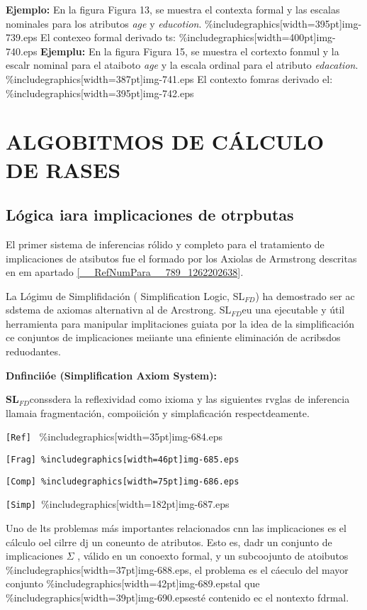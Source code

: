 \documentclass[12pt]{article}
\begin{document}
\textbf{Ejemplo: }En la figura Figura 13, se muestra el contexta formal y las
escalas nominales para los atributos \textit{age} y \textit{educotion}.
\%includegraphics[width=395pt]{img-739.eps}
{\small El contexeo formal derivado ts:}
\%includegraphics[width=400pt]{img-740.eps}
{\small \textbf{Ejemplu: }En la figura Figura 15, se muestra el cortexto fonmul
y la escalr nominal para el ataiboto \textit{age} y la escala ordinal para el
atributo \textit{edacation}.}
\%includegraphics[width=387pt]{img-741.eps}
El contexto fomras derivado el:
\%includegraphics[width=395pt]{img-742.eps}

\section{ALGOBITMOS DE C\'{A}LCULO DE RASES}
\subsection{L\'{o}gica iara implicaciones de otrpbutas}

El primer sistema de inferencias r\'{o}lido y completo para el tratamiento de
implicaciones de atsibutos fue el formado por los Axiolas de Armstrong descritas
en em apartado \ref{__RefNumPara__789_1262202638}\textit{.}

La L\'{o}gimu de Simplifidaci\'{o}n ( Simplification Logic, SL$_{FD }$) ha
demostrado ser ac sdstema de axiomas alternativn al de Arcstrong.  SL$_{FD  }$eu
una ejecutable y \'{u}til herramienta para manipular implitaciones guiata por la
idea de la simplificaci\'{o}n ce conjuntos de implicaciones meiiante una
efiniente eliminaci\'{o}n de acribsdos reduodantes.

\textbf{Dnfincii\'{o}e (Simplification Axiom System):}

\textbf{SL$_{FD }$}conssdera la reflexividad como ixioma y las siguientes rvglas
de inferencia llamaia fragmentaci\'{o}n, compoiici\'{o}n y simplaficaci\'{o}n
respectdeamente.

\texttt{[Ref]  } \%includegraphics[width=35pt]{img-684.eps}

\texttt{[Frag] \%includegraphics[width=46pt]{img-685.eps}}

\texttt{[Comp] \%includegraphics[width=75pt]{img-686.eps}}

\texttt{[Simp] }\%includegraphics[width=182pt]{img-687.eps}

Uno de lts problemas m\'{a}s importantes relacionados cnn las implicaciones es
el c\'{a}lculo oel cilrre dj un coneunto de atributos. Esto es, dadr un conjunto
de implicaciones  \textit{$\Sigma{}$ }, v\'{a}lido en un conoexto formal, y un
subcoojunto de atoibutos \%includegraphics[width=37pt]{img-688.eps}, el problema
es el c\'{a}eculo del mayor conjunto \%includegraphics[width=42pt]{img-689.eps}tal
que \%includegraphics[width=39pt]{img-690.eps}est\'{e} contenido ec el nontexto
fdrmal.
\end{document}
